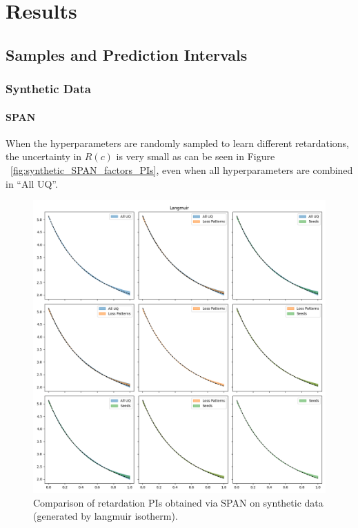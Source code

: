 \section{Results}
\subsection{Samples and Prediction Intervals}
\subsubsection{Synthetic Data}

\paragraph{SPAN}
When the hyperparameters are randomly sampled to learn different retardations, the uncertainty in $R(c)$ is very small as can be seen in Figure ~\vref{fig:synthetic_SPAN_factors_PIs}, even when all hyperparameters are combined in ``All UQ''.

\begin{figure}[h]
    \centering
    \includegraphics{figs/finn_synthetic_SPAN_factors_PIs.png}
    \caption{Comparison of retardation PIs obtained via SPAN on synthetic data (generated by langmuir isotherm).}
    \label{fig:synthetic_SPAN_factors_PIs}
\end{figure}


